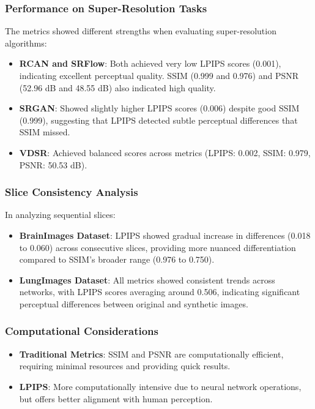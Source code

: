 \documentclass[a4paper,12pt]{article}
\begin{document}
\subsubsection{Performance on Super-Resolution Tasks}
The metrics showed different strengths when evaluating super-resolution algorithms:

\begin{itemize}
    \item \textbf{RCAN and SRFlow}: Both achieved very low LPIPS scores (0.001), indicating excellent perceptual quality. SSIM (0.999 and 0.976) and PSNR (52.96 dB and 48.55 dB) also indicated high quality.
    
    \item \textbf{SRGAN}: Showed slightly higher LPIPS scores (0.006) despite good SSIM (0.999), suggesting that LPIPS detected subtle perceptual differences that SSIM missed.
    
    \item \textbf{VDSR}: Achieved balanced scores across metrics (LPIPS: 0.002, SSIM: 0.979, PSNR: 50.53 dB).
\end{itemize}

\subsubsection{Slice Consistency Analysis}
In analyzing sequential slices:

\begin{itemize}
    \item \textbf{BrainImages Dataset}: LPIPS showed gradual increase in differences (0.018 to 0.060) across consecutive slices, providing more nuanced differentiation compared to SSIM's broader range (0.976 to 0.750).
    
    \item \textbf{LungImages Dataset}: All metrics showed consistent trends across networks, with LPIPS scores averaging around 0.506, indicating significant perceptual differences between original and synthetic images.
\end{itemize}

\subsubsection{Computational Considerations}
\begin{itemize}
    \item \textbf{Traditional Metrics}: SSIM and PSNR are computationally efficient, requiring minimal resources and providing quick results.
    
    \item \textbf{LPIPS}: More computationally intensive due to neural network operations, but offers better alignment with human perception.
\end{itemize}
\end{document}
